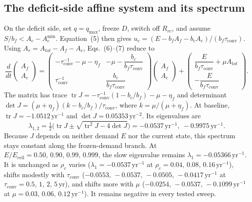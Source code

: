 \documentclass[11pt,a4paper]{article}
\newcommand{\Eceil}{E_{\mathrm{ceil}}}
\newcommand{\Acmin}{A_c^{\min}}
\newcommand{\tconv}{\tau_{\mathrm{conv}}}
\begin{document}
\subsection{The deficit-side affine system and its spectrum}\label{si:affine}

On the deficit side, set $q=q_{\max}$, freeze $D$, switch off $R_{rc}$, and assume $S/b_f<A_c-\Acmin$. Equation~(5) then gives $u_c=(E-b_fA_f-b_cA_c)/(b_f\tconv)$. Using $A_r=A_{tot}-A_f-A_c$, Eqs.~(6)--(7) reduce to
\begin{equation}
\frac{d}{dt}\begin{pmatrix}A_f\\A_c\end{pmatrix}=
\begin{pmatrix}-\tconv^{-1}-\mu-\eta_f & -\mu-\dfrac{b_c}{b_f\tconv}\\[8pt]\tconv^{-1} & \dfrac{b_c}{b_f\tconv}\end{pmatrix}
\begin{pmatrix}A_f\\A_c\end{pmatrix}+
\begin{pmatrix}\dfrac{E}{b_f\tconv}+\mu A_{tot}\\[8pt]-\dfrac{E}{b_f\tconv}\end{pmatrix}.
\end{equation}
The matrix has trace $\operatorname{tr}J=-\tconv^{-1}(1-b_c/b_f)-\mu-\eta_f$ and determinant $\det J=(\mu+\eta_f)(k-b_c/b_f)/\tconv$, where $k=\mu/(\mu+\eta_f)$. At baseline, $\operatorname{tr}J=-1.0512\,\mathrm{yr}^{-1}$ and $\det J=0.05353\,\mathrm{yr}^{-2}$. Its eigenvalues are
\begin{equation}
\lambda_{1,2}=\tfrac12\Big(\operatorname{tr}J\pm\sqrt{\operatorname{tr}^2J-4\det J}\Big)=-0.0537\,\mathrm{yr}^{-1},\ -0.9975\,\mathrm{yr}^{-1}.
\end{equation}
Because $J$ depends on neither demand $E$ nor the current state, this spectrum stays constant along the frozen-demand branch. At $E/\Eceil=0.50,\,0.90,\,0.99,\,0.999$, the slow eigenvalue remains $\lambda_1=-0.05366\,\mathrm{yr}^{-1}$. It is unchanged as $\rho_c$ varies ($\lambda_1=-0.0537\,\mathrm{yr}^{-1}$ at $\rho_c=0.04,\,0.08,\,0.16\,\mathrm{yr}^{-1}$), shifts modestly with $\tconv$ ($-0.0553,\,-0.0537,\,-0.0505,\,-0.0417\,\mathrm{yr}^{-1}$ at $\tconv=0.5,\,1,\,2,\,5\,\mathrm{yr}$), and shifts more with $\mu$ ($-0.0254,\,-0.0537,\,-0.1099\,\mathrm{yr}^{-1}$ at $\mu=0.03,\,0.06,\,0.12\,\mathrm{yr}^{-1}$). It remains negative in every tested sweep.
\end{document}
